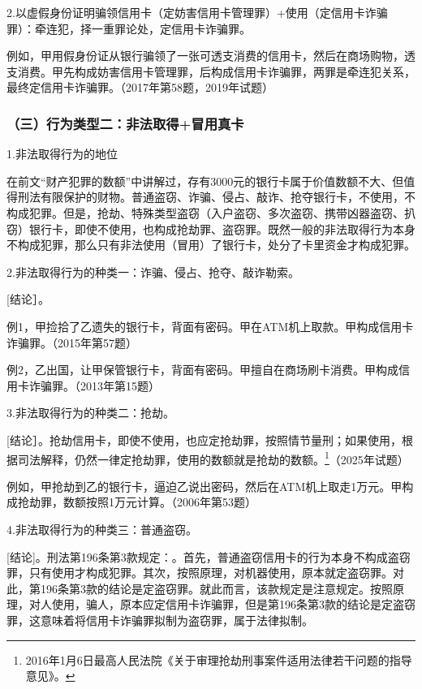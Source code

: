 2.以虚假身份证明骗领信用卡（定妨害信用卡管理罪）+使用（定信用卡诈骗罪）：牵连犯，择一重罪论处，定信用卡诈骗罪。

例如，甲用假身份证从银行骗领了一张可透支消费的信用卡，然后在商场购物，透支消费。甲先构成妨害信用卡管理罪，后构成信用卡诈骗罪，两罪是牵连犯关系，最终定信用卡诈骗罪。（2017年第58题，2019年试题）

\subsubsection*{（三）行为类型二：非法取得+冒用真卡}

1.非法取得行为的地位

在前文“财产犯罪的数额”中讲解过，存有3000元的银行卡属于价值数额不大、但值得刑法有限保护的财物。普通盗窃、诈骗、侵占、敲诈、抢夺银行卡，不使用，不构成犯罪。但是，抢劫、特殊类型盗窃（入户盗窃、多次盗窃、携带凶器盗窃、扒窃）银行卡，即使不使用，也构成抢劫罪、盗窃罪。既然一般的非法取得行为本身不构成犯罪，那么只有非法使用（冒用）了银行卡，处分了卡里资金才构成犯罪。

2.非法取得行为的种类一：诈骗、侵占、抢夺、敲诈勒索。

[结论］。

例1，甲捡拾了乙遗失的银行卡，背面有密码。甲在ATM机上取款。甲构成信用卡诈骗罪。（2015年第57题）

例2，乙出国，让甲保管银行卡，背面有密码。甲擅自在商场刷卡消费。甲构成信用卡诈骗罪。（2013年第15题）

3.非法取得行为的种类二：抢劫。

[结论］。抢劫信用卡，即使不使用，也应定抢劫罪，按照情节量刑；如果使用，根据司法解释，仍然一律定抢劫罪，使用的数额就是抢劫的数额。\footnote{2016年1月6日最高人民法院《关于审理抢劫刑事案件适用法律若干问题的指导意见》。}（2025年试题）

例如，甲抢劫到乙的银行卡，逼迫乙说出密码，然后在ATM机上取走1万元。甲构成抢劫罪，数额按照1万元计算。（2006年第53题）

4.非法取得行为的种类三：普通盗窃。

[结论]。刑法第196条第3款规定：。首先，普通盗窃信用卡的行为本身不构成盗窃罪，只有使用才构成犯罪。其次，按照原理，对机器使用，原本就定盗窃罪。对此，第196条第3款的结论是定盗窃罪。就此而言，该款规定是注意规定。按照原理，对人使用，骗人，原本应定信用卡诈骗罪，但是第196条第3款的结论是定盗窃罪，这意味着将信用卡诈骗罪拟制为盗窃罪，属于法律拟制。

